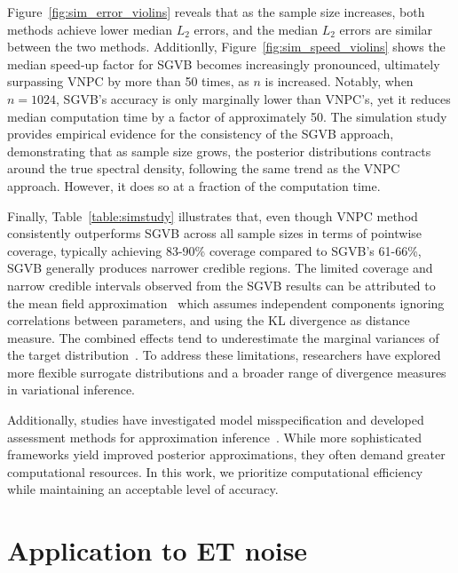 \documentclass[%
 reprint,
 amsmath,amssymb,
 aps,
 nofootinbib,
]{revtex4-2}
\begin{document}



Figure~\ref{fig:sim_error_violins} reveals that as the sample size increases, both methods achieve lower median $L_2$ errors, and the median $L_2$ errors are similar between the two methods.
Additionlly, Figure~\ref{fig:sim_speed_violins} shows the median speed-up factor for SGVB becomes increasingly pronounced, ultimately surpassing VNPC by more than 50 times, as $n$ is increased.
Notably, when $n=1024$, SGVB's accuracy is only marginally lower than VNPC's, yet it reduces median computation time by a factor of approximately 50.
The simulation study provides empirical evidence for the consistency of the SGVB approach, demonstrating that as sample size grows, the posterior distributions contracts around the true spectral density, following the same trend as the VNPC approach. However, it does so at a fraction of the computation time.

Finally, Table~\ref{table:simstudy} illustrates that, even though VNPC method consistently outperforms SGVB across all sample sizes in terms of pointwise coverage, typically achieving 83-90\% coverage compared to SGVB's 61-66\%, SGVB generally produces narrower credible regions.
%
The limited coverage and narrow credible intervals observed from the SGVB results can be attributed to the mean field approximation~\cite{Blei2017} which assumes independent components ignoring correlations between parameters, and using the KL divergence as distance measure.
The combined effects tend to underestimate the marginal variances of the target distribution~\cite{Blei2006,Wang2005}.
To address these limitations, researchers have explored more flexible surrogate distributions and a broader range of divergence measures in variational inference\cite{Kingma2013, Blei2017, Rezende2015,Yang2020,Higgins2017}.

Additionally, studies have investigated model misspecification and developed assessment methods for approximation inference~\cite{Wang2019, yao2018, lee2019, yu2021}.
While more sophisticated frameworks yield improved posterior approximations, they often demand greater computational resources.
In this work, we prioritize computational efficiency while maintaining an acceptable level of accuracy.



\section{Application to ET noise}
\label{sec:application}
\end{document}

